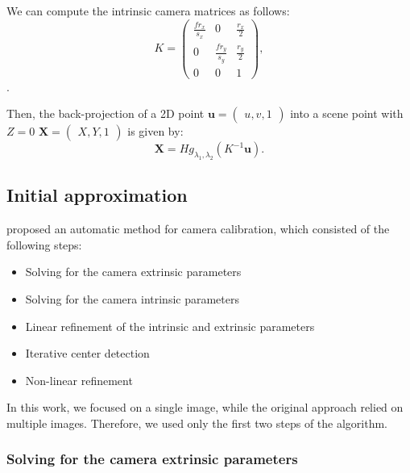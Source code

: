 We can compute the intrinsic camera matrices as follows:
\begin{equation}
	K = \begin{pmatrix}
		\frac{f r_x}{s_x} & 0                 & \frac{r_x}{2} \\
		0                 & \frac{f r_y}{s_y} & \frac{r_y}{2} \\
		0                 & 0                 & 1
	\end{pmatrix},
\end{equation}.

Then, the back-projection of a 2D point \(\mathbf{u} = \begin{pmatrix}
	u, v, 1
\end{pmatrix}\) into a scene point with \(Z = 0\) \(\mathbf{X} = \begin{pmatrix}
	X, Y, 1
\end{pmatrix}\) is given by:
\begin{equation}
	\mathbf{X} = H g_{\lambda_1, \lambda_2}(K^{-1} \mathbf{u}).
\end{equation}

\subsection{Initial approximation}\label{sub:initial_approximation}

\cite{scaramuzzaToolboxEasilyCalibrating2006} proposed an automatic method for
camera calibration, which consisted of the following steps:
\begin{itemize}
	\item Solving for the camera extrinsic parameters
	\item Solving for the camera intrinsic parameters
	\item Linear refinement of the intrinsic and extrinsic parameters
	\item Iterative center detection
	\item Non-linear refinement
\end{itemize}

In this work, we focused on a single image, while the original approach relied
on multiple images. Therefore, we used only the first two steps of the
algorithm.

\subsubsection{Solving for the camera extrinsic parameters}\label{ssub:solving_for_the_camera_extrinsic_parameters}

